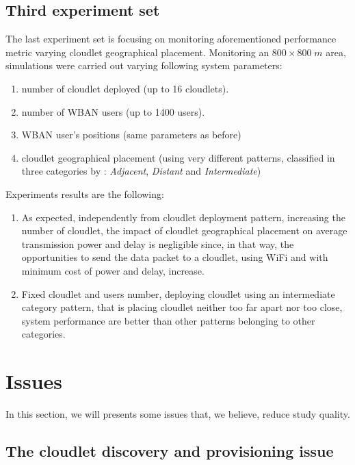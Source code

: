 \documentclass[sigchi]{acmart}
\begin{document}
\subsection{Third experiment set}

The last experiment set is focusing on monitoring aforementioned performance metric varying cloudlet geographical placement. Monitoring an $800 \times 800 \; m$ area, simulations were carried out varying following system parameters:

\begin{enumerate}
\item number of cloudlet deployed (up to 16 cloudlets).
\item number of WBAN users (up to 1400 users).
\item WBAN user's positions (same parameters as before)
\item cloudlet geographical placement (using very different patterns, classified in three categories by \citet{MSAReport}: \textit{Adjacent}, \textit{Distant} and \textit{Intermediate})
\end{enumerate}

Experiments results are the following:

\begin{enumerate}

\item As expected, independently from cloudlet deployment pattern, increasing the number of cloudlet, the impact of cloudlet geographical placement on average transmission power and delay is negligible since, in that way, the opportunities to send the data packet to a cloudlet, using WiFi and with minimum cost of power and delay, increase.

\item Fixed cloudlet and users number, deploying cloudlet using an intermediate category pattern, that is placing cloudlet neither too far apart nor too close, system performance are better than other patterns belonging to other categories.

\end{enumerate}

\section{Issues}

In this section, we will presents some issues that, we believe, reduce \citep{MSAReport} study quality.

\subsection{The cloudlet discovery and provisioning issue}
\end{document}
